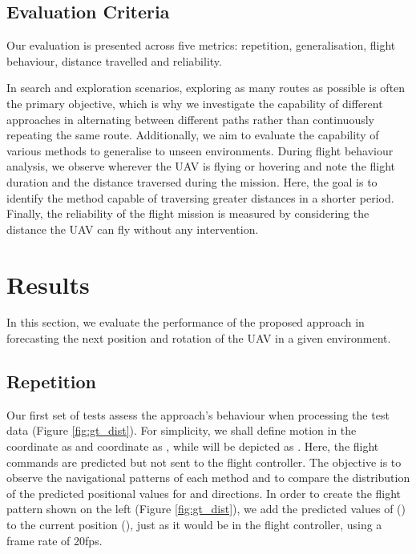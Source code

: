 \documentclass[letterpaper, 10 pt, journal, twoside]{IEEEtran}
\begin{document}
\subsection{Evaluation Criteria}
Our evaluation is presented across five metrics: repetition, generalisation, flight behaviour, distance travelled and reliability.

In search and exploration scenarios, exploring as many routes as possible is often the primary objective, which is why we investigate the capability of different approaches in alternating between different paths rather than continuously repeating the same route. Additionally, we aim to evaluate the capability of various methods to generalise to unseen environments. During flight behaviour analysis, we observe wherever the UAV is flying or hovering and note the flight duration and the distance traversed during the mission. Here, the goal is to identify the method capable of traversing greater distances in a shorter period. Finally, the reliability of the flight mission is measured by considering the distance the UAV can fly without any intervention.      \section{Results}
In this section, we evaluate the performance of the proposed approach in forecasting the next position and rotation of the UAV in a given environment.\vspace{-0.1cm}


\subsection{Repetition}
Our first set of tests assess the approach's behaviour when processing the test data (Figure \ref{fig:gt_dist}). For simplicity, we shall define motion in the  coordinate as  and  coordinate as , while  will be depicted as . Here, the flight commands are predicted but not sent to the flight controller. The objective is to observe the navigational patterns of each method and to compare the distribution of the predicted positional values for  and  directions. In order to create the flight pattern shown on the left (Figure \ref{fig:gt_dist}), we add the predicted values of () to the current position (), just as it would be in the flight controller, using a frame rate of 20fps.
\end{document}
